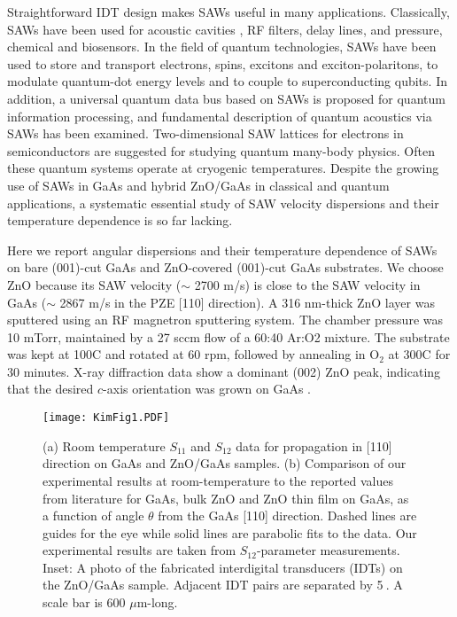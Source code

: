 \documentclass[aps,prb,amsmath,amssymb,footinbib,showpacs,superscriptaddress]{revtex4-1}%
\begin{document}
Straightforward IDT design makes SAWs useful in many applications. Classically, SAWs have been used for acoustic cavities \cite{Schuetz2015}, RF filters\cite{Yoshino2000}, delay lines\cite{Adkins1971}, and pressure\cite{Jiang2005}, chemical\cite{Kepley1992} and biosensors\cite{Fu2017}. In the field of quantum technologies, SAWs have been used to store and transport electrons\cite{Cunningham1999}, spins\cite{Sogawa2001}, excitons\cite{Alsina2004, Rudolph2007} and exciton-polaritons\cite{Cerda-Mendez2011}, to modulate quantum-dot energy levels\cite{Villa2017} and to couple to superconducting qubits\cite{Manenti2017}. In addition, a universal quantum data bus based on SAWs\cite{Schuetz2015} is proposed for quantum information processing, and fundamental description of  quantum acoustics via SAWs has been examined\cite{Aref2016}. Two-dimensional SAW lattices for electrons in semiconductors are suggested for studying quantum many-body physics\cite{Byrnes2007, Schuetz2017}. Often these quantum systems operate at cryogenic temperatures. Despite the growing use of SAWs in GaAs and hybrid ZnO/GaAs in classical and quantum applications, a systematic essential study of SAW velocity dispersions and their temperature dependence is so far lacking.  

Here we report angular dispersions and their temperature dependence of SAWs on bare (001)-cut GaAs and ZnO-covered (001)-cut GaAs substrates. We choose ZnO because its SAW velocity ($\sim$ 2700 m/s) is close to the SAW velocity in GaAs ($\sim$ 2867 m/s in the PZE [110] direction).  A 316 nm-thick ZnO layer was sputtered using an RF magnetron sputtering system. The chamber pressure was 10 mTorr, maintained by a 27 sccm flow of a 60:40 Ar:O2 mixture. The substrate was kept at 100\textdegree C and rotated at 60 rpm, followed by annealing in O$_2$ at 300\textdegree C for 30 minutes. X-ray diffraction data show a dominant (002) ZnO peak, indicating that the desired $c$-axis orientation was grown on GaAs \cite{Hickernell1976}. 

\begin{figure}[!htbp]                          
\texttt{[image: KimFig1.PDF]}
\caption{(a) Room temperature $S_{11}$ and  $S_{12}$ data for propagation in [110] direction on GaAs and ZnO/GaAs samples. (b) Comparison of our experimental results at room-temperature to the reported values from literature for GaAs\cite{Flannery1999}, bulk ZnO and ZnO thin film on GaAs\cite{Kim1994}, as a function of angle $\theta$ from the GaAs [110] direction. Dashed lines are guides for the eye while solid lines are parabolic fits to the data. Our experimental results are taken from $S_{12}$-parameter measurements. Inset: A photo of the fabricated interdigital transducers (IDTs) on the ZnO/GaAs sample. Adjacent IDT pairs are separated by 5\textdegree$\>$. A scale bar is 600 $\mu$m-long.}
\label{fig:fig1}
\end{figure}
\end{document}
